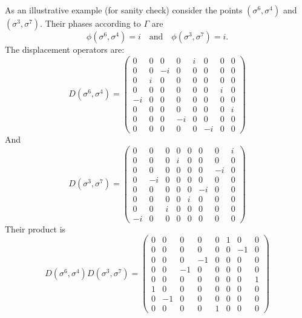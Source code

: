 \documentclass[a4paper]{article}
\begin{document}
  As an illustrative example (for sanity check) consider the
  points $(\sigma^6,\sigma^4)$ and $(\sigma^3,\sigma^7)$.
  Their phases according to $\Gamma$ are
  \begin{equation}
    \phi(\sigma^6,\sigma^4) = i
    \quad
    \text{and}
    \quad
    \phi(\sigma^3,\sigma^7) = i.
  \end{equation}
  The displacement operators are:
  \begin{equation}
    D(\sigma^6,\sigma^4) = 
    \displaystyle \left(\begin{array}{rrrrrrrr}
    0 & 0 & 0 & 0 & i & 0 & 0 & 0 \\
    0 & 0 & -i & 0 & 0 & 0 & 0 & 0 \\
    0 & i & 0 & 0 & 0 & 0 & 0 & 0 \\
    0 & 0 & 0 & 0 & 0 & 0 & i & 0 \\
    -i & 0 & 0 & 0 & 0 & 0 & 0 & 0 \\
    0 & 0 & 0 & 0 & 0 & 0 & 0 & i \\
    0 & 0 & 0 & -i & 0 & 0 & 0 & 0 \\
    0 & 0 & 0 & 0 & 0 & -i & 0 & 0
    \end{array}\right)
  \end{equation}
  And
  \begin{equation}
    D(\sigma^3,\sigma^7) = 
    \displaystyle \left(\begin{array}{rrrrrrrr}
    0 & 0 & 0 & 0 & 0 & 0 & 0 & i \\
    0 & 0 & 0 & i & 0 & 0 & 0 & 0 \\
    0 & 0 & 0 & 0 & 0 & 0 & -i & 0 \\
    0 & -i & 0 & 0 & 0 & 0 & 0 & 0 \\
    0 & 0 & 0 & 0 & 0 & -i & 0 & 0 \\
    0 & 0 & 0 & 0 & i & 0 & 0 & 0 \\
    0 & 0 & i & 0 & 0 & 0 & 0 & 0 \\
    -i & 0 & 0 & 0 & 0 & 0 & 0 & 0
    \end{array}\right)
  \end{equation}
  Their product is
  \begin{equation}
    D(\sigma^6,\sigma^4) D(\sigma^3,\sigma^7) =
    \displaystyle \left(\begin{array}{rrrrrrrr}
    0 & 0 & 0 & 0 & 0 & 1 & 0 & 0 \\
    0 & 0 & 0 & 0 & 0 & 0 & -1 & 0 \\
    0 & 0 & 0 & -1 & 0 & 0 & 0 & 0 \\
    0 & 0 & -1 & 0 & 0 & 0 & 0 & 0 \\
    0 & 0 & 0 & 0 & 0 & 0 & 0 & 1 \\
    1 & 0 & 0 & 0 & 0 & 0 & 0 & 0 \\
    0 & -1 & 0 & 0 & 0 & 0 & 0 & 0 \\
    0 & 0 & 0 & 0 & 1 & 0 & 0 & 0
    \end{array}\right)
  \end{equation}
\end{document}
